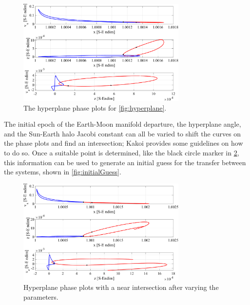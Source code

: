 \begin{figure}[ht]
    \centering
    \includegraphics[width=0.75\textwidth]{figures/PhasePlots.pdf}
    \caption{The hyperplane phase plots for \cref{fig:hyperplane}.}
    \label{fig:phasePlots}
\end{figure}

The initial epoch of the Earth-Moon manifold departure, the hyperplane angle, and the Sun-Earth
halo Jacobi constant can all be varied to shift the curves on the phase plots and find an
intersection; Kakoi provides some guidelines on how to do so\cite{Kakoi:2015}. Once a suitable
point is determined, like the black circle marker in \cref{fig:phasePlotsIntersect}, this
information can be used to generate an initial guess for the transfer between the systems, shown in
\cref{fig:initialGuess}.

\begin{figure}[ht]
    \centering
    \includegraphics[width=0.75\textwidth]{figures/PhasePlotsIntersect.pdf}
    \caption{Hyperplane phase plots with a near intersection after varying the parameters.}
    \label{fig:phasePlotsIntersect}
\end{figure}

